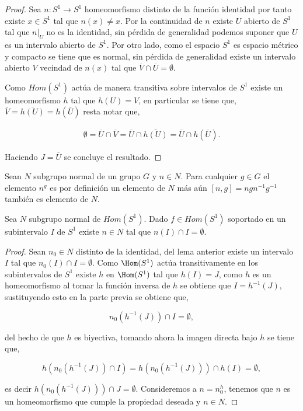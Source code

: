 \begin{proof}
Sea $n:S^1 \to S^1$ homeomorfismo distinto de la función identidad por tanto existe $x \in S^1$ tal que $n(x) \neq x$.  Por la continuidad de $n$ existe $U$  abierto de $S^1$ tal que $n|_U$ no es la identidad, sin pérdida de generalidad podemos suponer que $U$ es un intervalo abierto de $S^1$. Por otro lado, como el espacio $S^1$ es espacio métrico y compacto se tiene que es normal, sin pérdida de generalidad existe un intervalo abierto $V$ vecindad de $n(x)$ tal que $\overline{V} \cap \overline{U} = \emptyset. $ 

Como $Hom(S^1)$ actúa de manera transitiva sobre intervalos de $S^1$ existe un homeomorfismo $h$ tal que $h(U)=V$, en particular se tiene que, $\overline{V}=\overline{h(U)}=h(\overline{U})$ resta notar que, 

\begin{align*}
\emptyset=\overline{U} \cap \overline{V} = \overline{U} \cap \overline{h(U)}=\overline{U} \cap h(\overline{U}).
\end{align*}

Haciendo $J = \overline{U}$ se concluye el resultado. 
\end{proof}

\begin{ob}
Sean $N$ subgrupo normal de un grupo $G$ y $n \in N$. Para cualquier $g \in G$ el elemento $n^{g}$ es por definición un elemento de  $N$ más aún $[n,g]=ngn^{-1}g^{-1}$ también es elemento de $N$.
\end{ob}

\begin{lm}\label{lm:homeo_separador_de_intervalos}
Sea $N$ subgrupo normal  de $Hom(S^1)$. Dado $f \in Hom(S^1)$ soportado en un subintervalo $I$ de $S^1$ existe $n \in N$ tal que $n(I) \cap I = \emptyset.$
\end{lm}

\begin{proof}
Sean  $n_0 \in N$ distinto de la identidad, del lema anterior existe un intervalo $I$ tal que $n_0(I) \cap I =\emptyset.$ Como $\Hom(S^1)$ actúa transitivamente en los subintervalos de  $S^1$ existe $h$ en $\Hom(S^1)$ tal que $h(I) =J$, como $h$ es un homeomorfismo al tomar la función inversa de $h$ se obtiene que $I=h^{-1}(J)$, sustituyendo esto en la parte previa se obtiene que,

$$n_0(h^{-1}(J)) \cap I= \emptyset,$$

del hecho de que $h$ es biyectiva, tomando ahora la imagen directa bajo $h$ se tiene que,

$$h(n_0(h^{-1}(J)) \cap I)=h(n_0(h^{-1}(J))) \cap h(I)= \emptyset,$$

es decir $h(n_0(h^{-1}(J))) \cap J= \emptyset.$ Consideremos a $n=n_0^{h}$, tenemos que $n$ es un homeomorfismo que  cumple la propiedad deseada y $n \in N$.

\end{proof}

